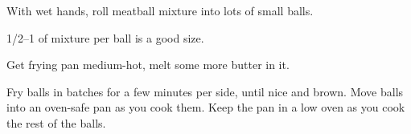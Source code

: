 \begin{recipe}
{		\vspace{1em}

		\step With wet hands, roll meatball mixture into lots of small balls.

		\vspace{1em}

		\SIrange{1/2}{1}{\tablespoon} of mixture per ball is a good size.

		\step Get frying pan medium-hot, melt some more butter in it.

		\vspace{1em}

		\step Fry balls in batches for a few minutes per side, until nice and brown. Move balls into an oven-safe pan as you cook them. Keep the pan in a low oven as you cook the rest of the balls.
	}

\end{recipe}